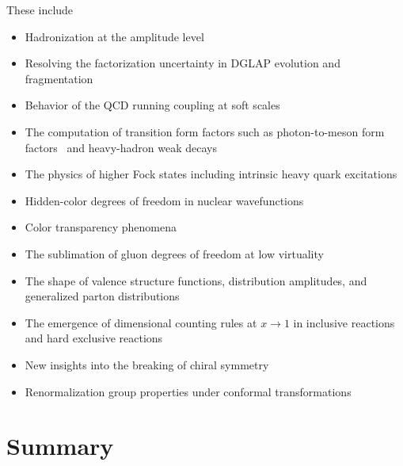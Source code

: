 \documentclass[prd,aps,onecolumn,nofootinbib]{revtex4}
\begin{document}
These include 
\begin{itemize}
\item 
Hadronization at the amplitude level~\cite{Brodsky:2008tk} 

\item 
Resolving the factorization uncertainty in DGLAP evolution and fragmentation

\item 
Behavior of the QCD running coupling at soft scales~\cite{Brodsky:2010ur}

\item The computation of transition form factors such as  photon-to-meson form factors~\cite{Brodsky:2011xx} and heavy-hadron weak decays

\item 
The physics of higher Fock states including intrinsic heavy quark excitations~\cite{Chang:2011du}


\item Hidden-color degrees of freedom in nuclear wavefunctions~\cite{Brodsky:1983vf}

\item Color transparency phenomena~\cite{Brodsky:1988xz,ElFassi:2012nr} 

\item  The sublimation of gluon degrees of freedom at low virtuality~\cite{Brodsky:2011pw}

\item  The shape of valence structure functions, distribution amplitudes, and generalized parton distributions~\cite{Vega:2012iz}

\item The emergence of dimensional counting rules at $x \to 1$ in inclusive reactions and hard exclusive reactions~\cite{Brodsky:1994kg}

\item New insights into the breaking of chiral symmetry~\cite{Kapusta:2011zza}

\item Renormalization group properties under conformal transformations~\cite{Glazek:2012am}

\end{itemize}








\section{Summary}
\end{document}
